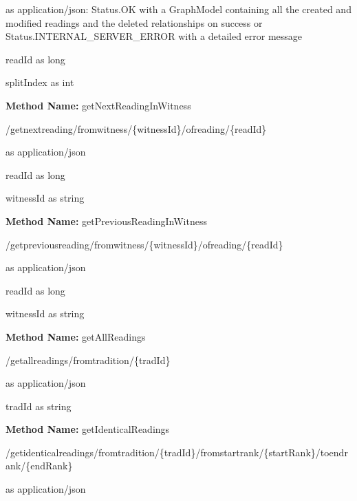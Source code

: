 \begin{response}
 as application/json: Status.OK with a GraphModel containing all the created and modified readings and the deleted relationships on success or Status.INTERNAL\_SERVER\_ERROR with a detailed error message
\end{response}
\begin{parameter}
readId as long
\end{parameter}
\begin{parameter}
splitIndex as int
\end{parameter}
\textbf{Method Name: }getNextReadingInWitness
\begin{get}
/getnextreading/fromwitness/\{witnessId\}/ofreading/\{readId\}
\end{get}
\begin{response}
 as application/json
\end{response}
\begin{parameter}
readId as long
\end{parameter}
\begin{parameter}
witnessId as string
\end{parameter}
\textbf{Method Name: }getPreviousReadingInWitness
\begin{get}
/getpreviousreading/fromwitness/\{witnessId\}/ofreading/\{readId\}
\end{get}
\begin{response}
 as application/json
\end{response}
\begin{parameter}
readId as long
\end{parameter}
\begin{parameter}
witnessId as string
\end{parameter}
\textbf{Method Name: }getAllReadings
\begin{get}
/getallreadings/fromtradition/\{tradId\}
\end{get}
\begin{response}
 as application/json
\end{response}
\begin{parameter}
tradId as string
\end{parameter}
\textbf{Method Name: }getIdenticalReadings
\begin{get}
/getidenticalreadings/fromtradition/\{tradId\}/fromstartrank/\{startRank\}/toendrank/\{endRank\}
\end{get}
\begin{response}
 as application/json
\end{response}
